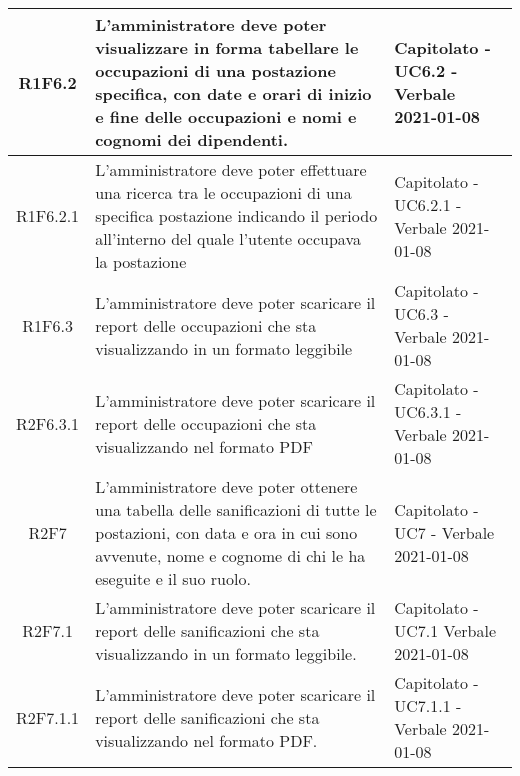 \begin{center}
\begin{longtable}{|c|p{10cm}|p{4cm}|}
			R1F6.2&L'amministratore deve poter visualizzare in forma tabellare le occupazioni di una postazione specifica, con date e orari di inizio e fine delle occupazioni e nomi e cognomi dei dipendenti.	&Capitolato - UC6.2 - Verbale 2021-01-08	\\
			\hline
			R1F6.2.1&L'amministratore deve poter effettuare una ricerca tra le occupazioni di una specifica postazione indicando il periodo all'interno del quale l'utente occupava la postazione	& 	Capitolato - UC6.2.1 - Verbale 2021-01-08\\
			\hline
			R1F6.3 & L'amministratore deve poter scaricare il report delle occupazioni che sta visualizzando in un formato leggibile & Capitolato - UC6.3 - Verbale 2021-01-08\\
			\hline
			R2F6.3.1 & L'amministratore deve poter scaricare il report delle occupazioni che sta visualizzando nel formato PDF & Capitolato - UC6.3.1 - Verbale 2021-01-08\\
			\hline
R2F7&L'amministratore deve poter ottenere una tabella delle sanificazioni di tutte le postazioni, con data e ora in cui sono avvenute, nome e cognome di chi le ha eseguite e il suo ruolo.	&Capitolato - UC7 - Verbale 2021-01-08	\\
					
					\hline
R2F7.1&L'amministratore deve poter scaricare il report delle sanificazioni che sta visualizzando in un formato leggibile.	&Capitolato - UC7.1 Verbale 2021-01-08	\\

\hline
R2F7.1.1&L'amministratore deve poter scaricare il report delle sanificazioni che sta visualizzando nel formato PDF.	&Capitolato - UC7.1.1 - Verbale 2021-01-08	\\


\end{longtable}
\end{center}
